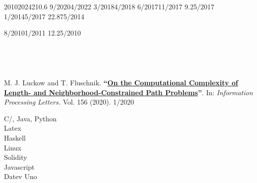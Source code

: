 \documentclass[11pt]{thyv}
\begin{document}
\begin{textblock}{5}
\begin{thyV}{2010}{2024}{21}{0.6\linewidth}
			 				{9/2020}{4/2022} 	{}
			 						{3/2018}{4/2018} 	{}
			 					{6/2017}{11/2017} 	{9.25/2017}
			 						{1/2014}{5/2017} 	{22.875/2014}

			 		{8/2010}{1/2011} 	{12.25/2010}
		\end{thyV}

		  
	\end{textblock}
	\begin{mdframed}
		\begin{minipage}[t]{0.50\textwidth}
			\vspace{-\baselineskip}
			\\
		\end{minipage}
		\begin{minipage}[t]{0.50\textwidth} 
			\vspace{-\baselineskip}
			\\
		\end{minipage}

			M. J. Luckow and T. Fluschnik. \textbf{``\href{https://doi.org/10.1016/j.ipl.2019.105913}{On the Computational Complexity of Length- and Neighborhood-Constrained Path Problems}''}. In: \textit{Information Processing Letters.} Vol. 156 (2020). \hfill \textcolor{thyGrey}{1/2020}

		\begin{minipage}[t]{0.45\textwidth}
			\vspace{-\baselineskip}
			\vspace*{-12pt}
			\hspace{-12pt}\thyChart
		\end{minipage}
		\begin{minipage}[t]{0.55\textwidth} 
			\vspace{-\baselineskip}
				C/\Cplusplus, Java, Python \hfill \ThreeOfFour \\
				Latex \hfill \FourOfFour \\
				Haskell \hfill \OneOfFour \\
				Linux \hfill \ThreeOfFour \\
				Solidity \hfill \TwoOfFour \\
				Javascript \hfill \TwoOfFour \\
				Datev Uno \hfill \FourOfFour
		\end{minipage}
		\vspace*{-20pt}


\end{mdframed}
\end{document}
